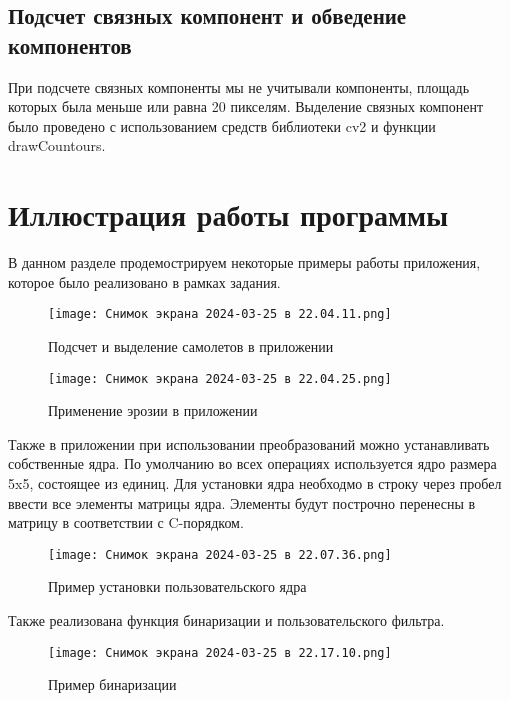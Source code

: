 \documentclass{article}
\begin{document}
\subsection{Подсчет связных компонент и обведение компонентов}

При подсчете связных компоненты мы не учитывали компоненты, площадь которых была меньше или равна 20 пикселям. Выделение связных компонент было проведено с использованием средств библиотеки cv2 и функции drawCountours.

\section{Иллюстрация работы программы}

В данном разделе продемострируем некоторые примеры работы приложения, которое было реализовано в рамках задания.

\begin{figure}[h!]
    \centering
    \texttt{[image: Снимок экрана 2024-03-25 в 22.04.11.png]}
    \caption{Подсчет и выделение самолетов в приложении}
    \label{fig:enter-label}
\end{figure}

\begin{figure}[h!]
    \centering
    \texttt{[image: Снимок экрана 2024-03-25 в 22.04.25.png]}
    \caption{Применение эрозии в приложении}
    \label{fig:enter-label}
\end{figure}

Также в приложении при использовании преобразований можно устанавливать собственные ядра. По умолчанию во всех операциях используется ядро размера 5x5, состоящее из единиц. Для установки ядра необходмо в строку через пробел ввести все элементы матрицы ядра. Элементы будут построчно перенесны в матрицу в соответствии с C-порядком.

\begin{figure}[h!]
    \centering
    \texttt{[image: Снимок экрана 2024-03-25 в 22.07.36.png]}
    \caption{Пример установки пользовательского ядра}
    \label{fig:enter-label}
\end{figure}

Также реализована функция бинаризации и пользовательского фильтра.

\begin{figure}[h!]
    \centering
    \texttt{[image: Снимок экрана 2024-03-25 в 22.17.10.png]}
    \caption{Пример бинаризации}
    \label{fig:enter-label}
\end{figure}
\end{document}
